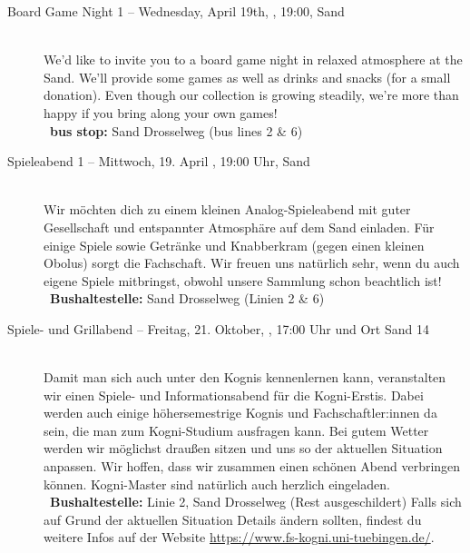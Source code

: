 \begin{description}
\ifml
	\item[Board Game Night 1 -- Wednesday, April 19th, \YEAR, 19:00, Sand]~\\
	We'd like to invite you to a board game night in relaxed atmosphere at the Sand.
    We'll provide some games as well as drinks and snacks (for a small donation).
    Even though our collection is growing steadily, we're more than happy if you bring along your own games!\\
	~\textbf{bus stop:} Sand Drosselweg (bus lines 2 \& 6)
\else
    \item[Spieleabend 1 -- Mittwoch, 19. April \YEAR, 19:00 Uhr, Sand]~\\
	Wir möchten dich zu einem kleinen Analog-Spieleabend mit guter Gesellschaft und entspannter Atmosphäre auf dem Sand einladen.
    Für einige Spiele sowie Getränke und Knabberkram (gegen einen kleinen Obolus) sorgt die Fachschaft.
    Wir freuen uns natürlich sehr, wenn du auch eigene Spiele mitbringst, obwohl unsere Sammlung schon beachtlich ist!\\
	~\textbf{Bushaltestelle:} Sand Drosselweg (Linien 2 \& 6)
\fi

\ifkogwiss
    \item[Spiele- und Grillabend -- Freitag, 21. Oktober, \YEAR, 17:00 Uhr und Ort Sand 14]\ \\
	Damit man sich auch unter den Kognis kennenlernen kann, veranstalten wir einen Spiele- und Informationsabend für die Kogni-Erstis. Dabei werden auch einige
	höhersemestrige Kognis und Fachschaftler:innen da sein, die man zum Kogni-Studium ausfragen kann. Bei gutem Wetter werden wir möglichst draußen sitzen und
	uns so der aktuellen Situation anpassen. Wir hoffen, dass wir zusammen einen schönen Abend verbringen können. Kogni-Master sind natürlich auch herzlich eingeladen.
	~\textbf{Bushaltestelle:} Linie 2, Sand Drosselweg (Rest ausgeschildert)
	Falls sich auf Grund der aktuellen Situation Details ändern sollten, findest du weitere Infos auf der Website \url{https://www.fs-kogni.uni-tuebingen.de/}.
\fi


\end{description}
